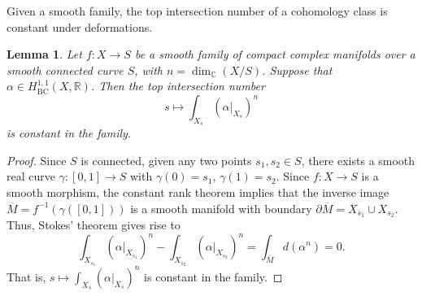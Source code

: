 \documentclass[12pt]{amsart}
\numberwithin{equation}{section}
\newtheorem{lemma}  [theorem]     {Lemma}
\theoremstyle{definition}
\theoremstyle{plain}
\newtheorem*{thm A*}{Theorem A}
\newtheorem*{thm B*}{Theorem B}
\newtheorem*{thm C*}{Theorem C}
\newtheorem*{thm D*}{Theorem D}
\theoremstyle{definition}
\renewcommand{\1}{\mathds{1}}
\renewcommand{\>}{\rightarrow}
\begin{document}
Given a smooth family, the top intersection number of a cohomology class is constant under deformations.
\begin{lemma}\label{constIntersection}
Let $f: X \to S$ be a smooth family of compact complex manifolds over a smooth connected curve $S$, with $n = \dim_{\mathbb{C}}(X/S)$. Suppose that $\alpha \in H^{1,1}_{\mathrm{BC}}(X, \mathbb{R})$. Then the top intersection number
$$
s \longmapsto \int_{X_s} (\alpha|_{X_s})^n
$$
is constant in the family.
\end{lemma}
\begin{proof}
Since $S$ is connected, given any two points $s_1, s_2 \in S$, there exists a smooth real curve $\gamma : [0,1] \to S$ with $\gamma(0) = s_1$, $\gamma(1) = s_2$. Since $f:X\to S$ is a smooth morphism, the constant rank theorem implies that the inverse image $\overline{M} = f^{-1}(\gamma([0,1]))$ is a smooth manifold with boundary $\partial \overline{M} = X_{s_1} \cup X_{s_2}$. Thus, Stokes' theorem gives rise to  
$$
\int_{X_{s_1}}  (\alpha|_{X_{s_1}})^n - \int_{X_{s_2}} (\alpha|_{X_{s_2}})^n = \int_{\overline{M}} d(\alpha^n) = 0.
$$
That is, $s \longmapsto \int_{X_s} (\alpha|_{X_s})^n$ is constant in the family.
\end{proof}

\end{document}
